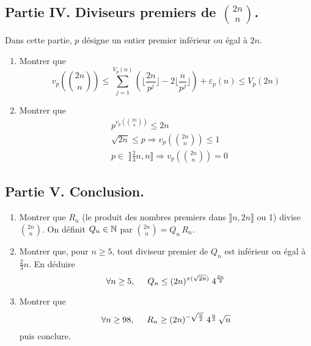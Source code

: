 \subsection*{Partie IV. Diviseurs premiers de $\binom{2n}{n}$.}
 Dans cette partie, $p$ désigne un entier premier inférieur ou égal à $2n$.
\begin{enumerate}
\item Montrer que 
\begin{displaymath}
  v_p(\binom{2n}{n}) \leq \sum_{j=1}^{V_p(n)} \left(\lfloor \frac{2n}{p^j}\rfloor -2\lfloor \frac{n}{p^j} \rfloor \right) 
   + \varepsilon_p(n) \leq V_p(2n)
\end{displaymath}

\item Montrer que 
\begin{align}
&p^{v_p(\binom{2n}{n})} \leq 2n \\
&\sqrt{2n} \leq p \Rightarrow v_p(\binom{2n}{n}) \leq 1\\
&p\in \;\rrbracket \frac{2}{3}n , n \rrbracket \Rightarrow v_p(\binom{2n}{n}) = 0
\end{align}

\end{enumerate}

 
\subsection*{Partie V. Conclusion.}
 \begin{enumerate}
   \item Montrer que $R_n$ (le produit des nombres premiers dans $\rrbracket n, 2n \rrbracket$ ou 1) divise $\binom{2n}{n}$. On définit $Q_n\in \mathbb{N}$ par $\binom{2n}{n} = Q_n\, R_n$.
   \item Montrer que, pour $n\geq 5$, tout diviseur premier de $Q_n$ est inférieur ou égal à $\frac{2}{3}n$. En déduire 
\begin{displaymath}
  \forall n \geq 5, \hspace{0.5cm} Q_n \leq (2n)^{\pi(\sqrt{2n})}\; 4^{\frac{2n}{3}}
\end{displaymath}
   \item Montrer que 
\begin{displaymath}
  \forall n \geq 98, \hspace{0.5cm} R_n \geq (2n)^{-\sqrt{\frac{n}{2}}}\; 4^{\frac{n}{3}}\, \sqrt{n}
\end{displaymath}
puis conclure.
 \end{enumerate}
